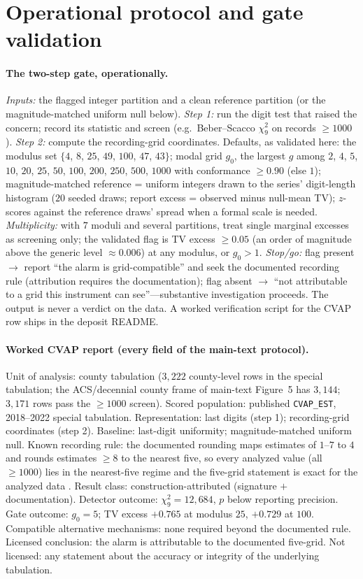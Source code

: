 \documentclass[12pt]{article}
\begin{document}
\section{Operational protocol and gate validation}
\label{s:protocol}

\paragraph{The two-step gate, operationally.}
\emph{Inputs:} the flagged integer partition and a clean reference partition
(or the magnitude-matched uniform null below). \emph{Step 1:} run the digit
test that raised the concern; record its statistic and screen (e.g.\
Beber--Scacco $\chi^2_9$ on records $\ge 1000$). \emph{Step 2:} compute the
recording-grid coordinates. Defaults, as validated here: the modulus set $\{4$, $8$, $25$, $49$,
$100$, $47$, $43\}$; modal grid $g_0$, the
largest $g$ among $2$, $4$, $5$, $10$, $20$, $25$, $50$, $100$, $200$,
$250$, $500$, $1000$ with conformance $\ge 0.90$ (else $1$); magnitude-matched reference = uniform integers drawn
to the series' digit-length histogram ($20$ seeded draws; report excess =
observed minus null-mean TV); $z$-scores against the reference draws'
spread when a formal scale is needed. \emph{Multiplicity:} with $7$ moduli
and several partitions, treat single marginal excesses as screening only;
the validated flag is TV excess $\ge 0.05$ (an order of magnitude above the
generic level $\approx 0.006$) at any modulus, or $g_0 > 1$.
\emph{Stop/go:} flag present $\to$ report ``the alarm is grid-compatible''
and seek the documented recording rule (attribution requires the
documentation); flag absent $\to$ ``not attributable to a grid this
instrument can see''---substantive investigation proceeds. The output is
never a verdict on the data. A worked verification script for the CVAP row
ships in the deposit README.

\paragraph{Worked CVAP report (every field of the main-text protocol).}
Unit of analysis: county tabulation ($3{,}222$ county-level rows in the
special tabulation; the ACS/decennial county frame of main-text Figure~5 has
$3{,}144$; $3{,}171$ rows pass the $\ge 1000$ screen). Scored population: published \texttt{CVAP\_EST},
2018--2022 special tabulation. Representation: last digits (step 1);
recording-grid coordinates (step 2). Baseline: last-digit uniformity;
magnitude-matched uniform null. Known recording rule: the documented rounding maps estimates of $1$--$7$
to $4$ and rounds estimates $\ge 8$ to the nearest five, so every analyzed
value (all $\ge 1000$) lies in the nearest-five regime and the five-grid
statement is exact for the analyzed data \citep{cvaptechdoc}. Result class: construction-attributed (signature
$+$ documentation). Detector outcome: $\chi^2_9 = 12{,}684$, $p$ below
reporting precision. Gate outcome: $g_0 = 5$; TV excess $+0.765$ at modulus
$25$, $+0.729$ at $100$. Compatible alternative mechanisms: none required
beyond the documented rule. Licensed conclusion: the alarm is attributable
to the documented five-grid. Not licensed: any statement about the accuracy
or integrity of the underlying tabulation.
\end{document}

